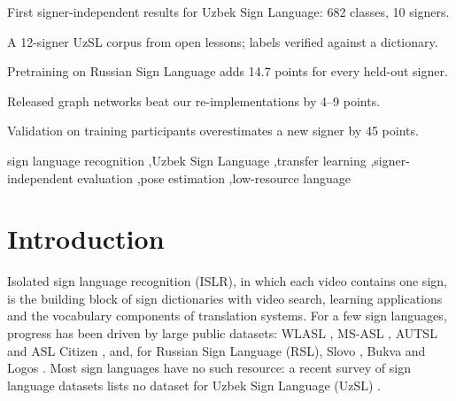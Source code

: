 \documentclass[a4paper,fleqn]{cas-dc}
\begin{document}
\begin{highlights}
\item First signer-independent results for Uzbek Sign Language: 682 classes, 10 signers.
\item A 12-signer UzSL corpus from open lessons; labels verified against a dictionary.
\item Pretraining on Russian Sign Language adds 14.7 points for every held-out signer.
\item Released graph networks beat our re-implementations by 4–9 points.
\item Validation on training participants overestimates a new signer by 45 points.
\end{highlights}
\begin{keywords}
sign language recognition \sep Uzbek Sign Language \sep transfer learning \sep signer-independent evaluation \sep pose estimation \sep low-resource language
\end{keywords}
\maketitle
\hypertarget{introduction}{%
\section{Introduction}\label{introduction}}

Isolated sign language recognition (ISLR), in which each video contains one sign, is the building block of sign dictionaries with video search, learning applications and the vocabulary components of translation systems. For a few sign languages, progress has been driven by large public datasets: WLASL \cite{2020_li_wlasl}, MS-ASL \cite{2019_joze_msasl}, AUTSL \cite{2020_sincan_autsl} and ASL Citizen \cite{2023_desai_asl_citizen}, and, for Russian Sign Language (RSL), Slovo \cite{2023_kapitanov_slovo}, Bukva \cite{2024_kvanchiani_bukva} and Logos \cite{2025_ovodov_logos}. Most sign languages have no such resource: a recent survey of sign language datasets lists no dataset for Uzbek Sign Language (UzSL) \cite{2026_ni_sign_language_datasets_survey}.
\end{document}
